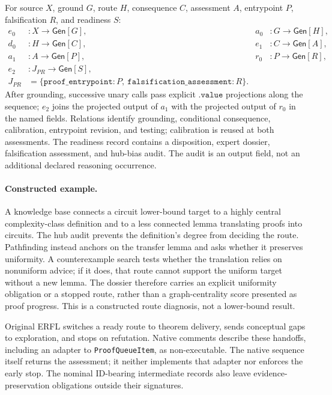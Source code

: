 For source $X$, ground $G$, route $H$, consequence $C$, assessment $A$, entrypoint
$P$, falsification $R$, and readiness $S$:
\[
\begin{aligned}
 e_0 &:X\to\mathsf{Gen}[G],&a_0 &:G\to\mathsf{Gen}[H],\\
 d_0 &:H\to\mathsf{Gen}[C],&e_1 &:C\to\mathsf{Gen}[A],\\
 a_1 &:A\to\mathsf{Gen}[P],&r_0 &:P\to\mathsf{Gen}[R],\\
 e_2 &:J_{PR}\to\mathsf{Gen}[S],\\
 J_{PR}&=\{\mathtt{proof\_entrypoint}:P,
           \ \mathtt{falsification\_assessment}:R\}.
\end{aligned}
\]
After grounding, successive unary calls pass explicit $\mathtt{.value}$
projections along the sequence; $e_2$ joins the projected output of $a_1$ with
the projected output of $r_0$ in the named fields.
Relations identify grounding, conditional consequence, calibration,
entrypoint revision, and testing; calibration is reused at both assessments.
The readiness record contains a disposition, expert dossier, falsification
assessment, and hub-bias audit. The audit is an output field, not an additional
declared reasoning occurrence.

\paragraph{Constructed example.}
A knowledge base connects a circuit lower-bound target to a highly central
complexity-class definition and to a less connected lemma translating proofs into
circuits. The hub audit prevents the definition's degree from deciding the route.
Pathfinding instead anchors on the transfer lemma and asks whether it preserves
uniformity. A counterexample search tests whether the translation relies on
nonuniform advice; if it does, that route cannot support the uniform target
without a new lemma. The dossier therefore carries an explicit uniformity
obligation or a stopped route, rather than a graph-centrality score presented as
proof progress. This is a constructed route diagnosis, not a lower-bound result.

Original ERFL switches a ready route to theorem delivery, sends conceptual gaps
to exploration, and stops on refutation. Native comments describe these
handoffs, including an adapter to \texttt{ProofQueueItem}, as non-executable.
The native sequence itself returns the assessment; it neither implements that
adapter nor enforces the early stop. The nominal ID-bearing intermediate records
also leave evidence-preservation obligations outside their signatures.

